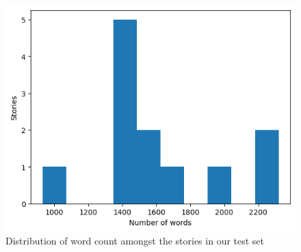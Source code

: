 \begin{figure}
\small
\centering
\includegraphics[width=\textwidth]{figures/length.png}
\caption{\label{length} Distribution of word count amongst the stories in our test set}
\end{figure}


